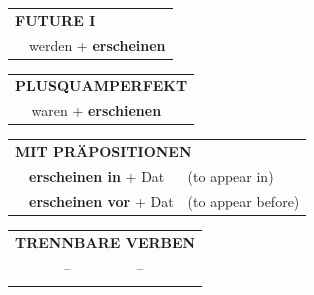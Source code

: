 \documentclass[10pt,a4paper]{revtex4-2}
\begin{document}
\begin{verbbox-dat}
\begin{tabular}{rl}
    \multicolumn{2}{l}{\textbf{FUTURE I} }\\
   & werden + \textbf{erscheinen}\\
 
  \end{tabular}
\hfill
   \begin{tabular}{rl}
      \multicolumn{2}{l}{\textbf{PLUSQUAMPERFEKT}}\\
   & waren + \textbf{erschienen}\\
  \end{tabular}

   \vspace{10pt}

   \begin{tabular}{lll}
      \multicolumn{3}{l}{\textbf{MIT PRÄPOSITIONEN}}\\
& \textbf{erscheinen in} + Dat & (to appear in)\\
& \textbf{erscheinen vor} + Dat & (to appear before)\\
\end{tabular}
  \hfill
   \begin{tabular}{lll}
      \multicolumn{3}{l}{\textbf{TRENNBARE VERBEN}}\\
 & -- & --\\
\vspace{10pt}
  \end{tabular}


  \vspace{-5pt}


\end{verbbox-dat}
\end{document}

